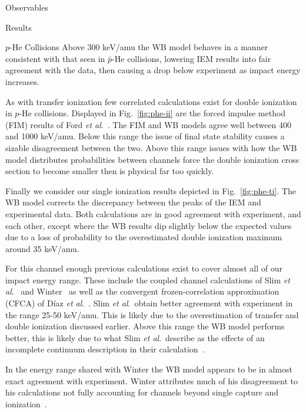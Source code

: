 \documentclass[letterpaper, 11 pt]{report}
\begin{document}
\begin{chapter}{Observables \label{chap:p-he2p-he}}
\begin{section}{Results \label{sec:phe2p-res}}
\begin{subsection}{\texorpdfstring{$p$}{p}-He Collisions \label{sec:phe-res}}
         Above 300 keV/amu the WB model behaves in a manner consistent with that seen in $\bar{p}$-He
         collisions, lowering IEM results into fair agreement with the data, then causing a drop below
         experiment as impact energy increases.
         
         As with transfer ionization few correlated calculations exist for double ionization in $p$-He
         collisions. Displayed in Fig.~\ref{fig:phe-ii} are the forced impulse method (FIM) results of
         Ford \textit{et al}.\ \cite{FR-94}. The FIM and WB models agree well between 400 and 1000
         keV/amu. Below this range the issue of final state stability causes a sizable disagreement
         between the two. Above this range issues with how the WB model distributes probabilities
         between channels force  the double ionization cross section to become smaller then is physical
         far too quickly.

         Finally we consider our single ionization results depicted in Fig.~\ref{fig:phe-ti}. The WB
         model corrects the discrepancy between the peaks of the IEM and experimental data. Both
         calculations are in good agreement with experiment, and each other, except where the WB results
         dip slightly below the expected values due to a loss of probability to the overestimated double
         ionization maximum around 35 keV/amu.

         For this channel enough previous calculations exist to cover almost all of our impact energy
         range. These include the coupled channel calculations of Slim \textit{et al}.~\cite{SHBF-91}
         and Winter~\cite{Winter-91} as well as the convergent frozen-correlation approximation (CFCA)
         of D\'{i}az \textit{et al}.~\cite{DMS-00}. Slim \textit{et al}.\ obtain better agreement with
         experiment in the range 25-50 keV/amu. This is likely due to the overestimation of transfer and
         double ionization discussed earlier. Above this range the WB model performs better, this is
         likely due to what Slim \textit{et al}.\ describe as the effects of an incomplete continuum
         description in their calculation~\cite{SHBF-91}.
         
         In the energy range shared with Winter the WB model appears to be in almost exact agreement
         with experiment. Winter attributes much of his disagreement to his calculations not fully
         accounting for channels beyond single capture and ionization~\cite{Winter-91}.


\end{subsection}
\end{section}
\end{chapter}
\end{document}
